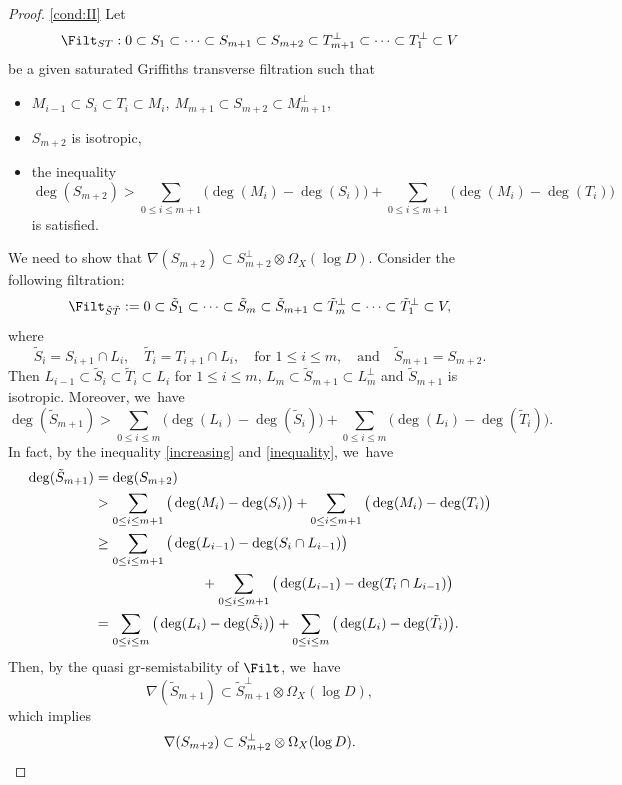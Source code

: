 \begin{proof}
\eqref{cond:II}
Let
\[
\Filt_{ST}:0\subset S_1 \subset \cdots\subset S_{m+1}\subset S_{m+2}\subset T_{m+1}^\perp\subset\cdots \subset T_1^\perp\subset V
\]
be a given saturated Griffiths transverse filtration such that
\begin{itemize}
\item $M_{i-1}\subset S_i \subset T_i \subset M_i,\ M_{m+1}\subset S_{m+2}\subset M_{m+1}^\perp$,
\item $S_{m+2}$ is isotropic,
\item the inequality
\begin{equation}\label{inequality}
\deg(S_{m+2})>\sum_{0\leq i\leq m+1}\big(\deg(M_i)-\deg(S_i)\big)+\sum_{0\leq i\leq m+1}\big(\deg(M_i)-\deg(T_i)\big)
\end{equation}
is satisfied.
\end{itemize}
We need to show that $\nabla(S_{m+2})\subset S_{m+2}^\perp\otimes \Omega_X(\log D)$. Consider the following filtration:
\[
\Filt_{\tilde{S}\tilde{T}}:=0\subset \tilde{S}_1\subset \cdots\subset \tilde{S}_m\subset \tilde{S}_{m+1}\subset \tilde{T}_m^\perp\subset\cdots \subset \tilde{T}_1^\perp\subset V,
\]
where
\[
\tilde{S}_i=S_{i+1}\cap L_i,\quad \tilde{T}_i=T_{i+1}\cap L_i,\quad \text{for $1\leq i\leq m$},\quad\text{and}\quad\tilde{S}_{m+1}=S_{m+2}.
\]
Then $L_{i-1}\subset \tilde{S}_i\subset \tilde{T}_i\subset L_i$ for $1\leq i\leq m$, $L_m\subset\tilde{S}_{m+1}\subset L_m^\perp$ and $\tilde{S}_{m+1}$ is isotropic. Moreover, we~have
\[
\deg(\tilde{S}_{m+1})>\sum_{0\leq i\leq m}\big(\deg(L_i)-\deg(\tilde{S}_i)\big)+\sum_{0\leq i\leq m}\big(\deg(L_i)-\deg(\tilde{T}_i)\big).
\]
In fact, by the inequality \ref{increasing} and \ref{inequality}, we~have
\begin{equation}
\begin{split}
\deg(\tilde{S}_{m+1})&=\deg(S_{m+2})\\
&>\sum_{0\leq i\leq m+1}\big(\deg(M_i)-\deg(S_i)\big)+\sum_{0\leq i\leq m+1}\big(\deg(M_i)-\deg(T_i)\big)\\
&\geq \sum_{0\leq i\leq m+1}\big(\deg(L_{i-1})-\deg(S_i\cap L_{i-1})\big) \\
& \hspace*{2.7cm}+\sum_{0\leq i\leq m+1}\big(\deg(L_{i-1})-\deg(T_i\cap L_{i-1})\big)\\
&=\sum_{0\leq i\leq m}\big(\deg(L_i)-\deg(\tilde{S}_i)\big)+\sum_{0\leq i\leq m}\big(\deg(L_i)-\deg(\tilde{T}_i)\big).
\end{split}
\end{equation}
Then, by the quasi gr-semistability of $\Filt$, we~have
\[
\nabla(\tilde{S}_{m+1})\subset\tilde{S}_{m+1}^\perp\otimes\Omega_X(\log D),
\]
which implies
\[
\nabla(S_{m+2})\subset S_{m+2}^\perp\otimes \Omega_X(\log D).\qedhere
\]
\end{proof}

